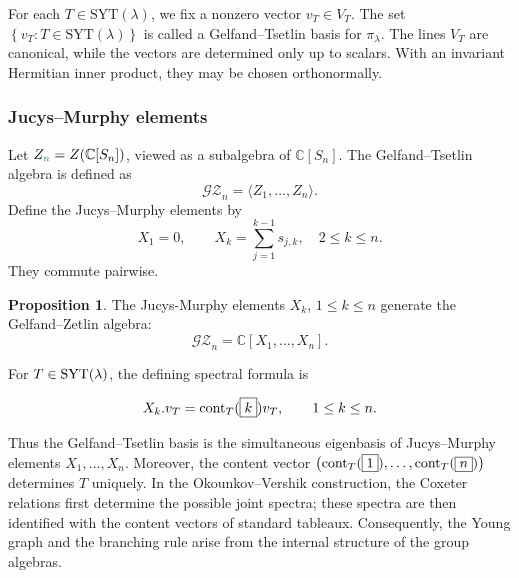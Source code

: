 \documentclass[11pt]{amsart}
\numberwithin{equation}{section}
\theoremstyle{definition}
\newtheorem{proposition}[thm]{Proposition}
\begin{document}
For each $T \in \mathrm{SYT}(\lambda)$, we fix a nonzero vector $v_{T}\in V_{T}$.  The set $\left\{ v_T: T \in \mathrm{SYT}(\lambda) \right\}$ is called a Gelfand--Tsetlin basis for $\pi_{\lambda}$.
The lines $V_{T}$ are canonical, while the vectors are determined only up to
scalars. With an invariant Hermitian inner product, they may be chosen
orthonormally. 










\subsubsection{Jucys--Murphy elements} \label{ss JM elements}

Let $Z_{{\color{teal} n}}=Z(\mathbb{C}[S_{n}])$, viewed as a subalgebra of $\mathbb{C}[S_{n}]$. The
Gelfand--Tsetlin algebra is defined as
\begin{equation*}
     \mathcal{GZ}_{n}=\langle Z_{1},\ldots,Z_{n}\rangle.
\end{equation*}
Define the Jucys--Murphy elements by
\begin{equation}
  X_1=0,
  \qquad
  X_k=\sum_{j=1}^{k-1}s_{j,k},
  \quad 2\leq k\leq n.
  \label{eq:yjm}
\end{equation}
They commute pairwise.

\begin{proposition}\cite[Proposition 2.1]{okounkov1996new}
    The Jucys-Murphy elements $X_k$, $1\leq k\leq n$ generate the Gelfand–Zetlin algebra:
    \begin{equation}
\mathcal{GZ}_n=\mathbb{C}[X_1,\ldots,X_n].
  \label{eq:gz-yjm}
\end{equation}
\end{proposition}

For $T\in\textnormal{SYT}(\lambda)$, the defining spectral formula is

\begin{equation} 
  X_{k}.v_{T}=\textnormal{cont}_{T}(\boxed{k })v_{T},
  \qquad 1\leq k\leq n.
  \label{eq:content-eigenvalue}
\end{equation}

Thus the Gelfand--Tsetlin basis is the simultaneous eigenbasis of Jucys–Murphy elements
$X_{1},\ldots,X_{n}$.  Moreover, the content vector
$\bigl(\textnormal{cont}_{T}(\boxed{1}),\ldots,\textnormal{cont}_{T}(\boxed{n})\bigr)$ determines $T$ uniquely.  In the
Okounkov--Vershik construction, the Coxeter relations first determine the possible joint spectra; these spectra are then identified with the content vectors of standard tableaux.  Consequently, the Young graph and the branching rule arise from the internal structure of the group algebras.
\end{document}
